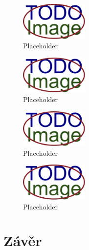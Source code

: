 
\blindtext

\blindtext

\begin{figure}[hbt]
    \centering
    \includegraphics[width=0.3\textwidth]{obrazky/placeholder.pdf}
    \caption{Placeholder}
    \label{pic:placeholder}
\end{figure}

\blindtext

\begin{figure}[hbt]
    \centering
    \includegraphics[width=0.3\textwidth]{obrazky/placeholder.pdf}
    \caption{Placeholder}
    \label{pic:placeholder}
\end{figure}

\blindtext

\blindtext

\blindtext

\begin{figure}[hbt]
    \centering
    \includegraphics[width=0.3\textwidth]{obrazky/placeholder.pdf}
    \caption{Placeholder}
    \label{pic:placeholder}
\end{figure}

\blindtext

\blinditemize

\blindtext

\blindtext

\blinditemize

\blindtext

\begin{figure}[hbt]
    \centering
    \includegraphics[width=0.3\textwidth]{obrazky/placeholder.pdf}
    \caption{Placeholder}
    \label{pic:placeholder}
\end{figure}

\blindtext

\blindtext

\chapter{Závěr}
\label{cha:conclusion}

\blindtext

\blindtext

\blindtext

